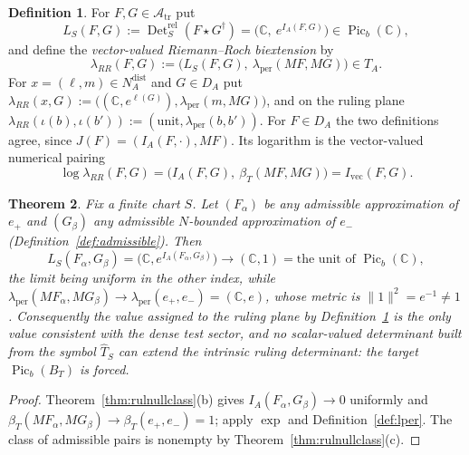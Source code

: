 \documentclass[11pt]{amsart}
\newtheorem{theorem}{Theorem}[section]
\theoremstyle{definition}
\newtheorem{definition}[theorem]{Definition}
\theoremstyle{remark}
\newcommand{\C}{\mathbb C}
\newcommand{\Det}{\operatorname{Det}}
\newcommand{\Picb}{\operatorname{Pic}_{b}}
\newcommand{\Th}{\widehat{T}}
\newcommand{\DA}{D_A}
\newcommand{\Atr}{\mathcal A_{\mathrm{tr}}}
\newcommand{\BT}{B_T}
\newcommand{\NAd}{N_A^{\mathrm{dist}}}
\begin{document}
\begin{definition}\label{def:RR}
For $F,G\in\Atr$ put
\begin{equation}\label{eq:LS}
L_S(F,G):=\Det^{\mathrm{rel}}_S(F\star G^{\dagger})=
\bigl(\C,\ e^{I_A(F,G)}\bigr)\in\Picb(\C),
\end{equation}
and define the \emph{vector-valued Riemann--Roch biextension} by
\begin{equation}\label{eq:lRR}
\lambda_{RR}(F,G):=\bigl(L_S(F,G),\ \lambda_{\mathrm{per}}(MF,MG)\bigr)\in T_A .
\end{equation}
For $x=(\ell,m)\in\NAd$ and $G\in\DA$ put
$\lambda_{RR}(x,G):=\bigl((\C,e^{\ell(G)}),\lambda_{\mathrm{per}}(m,MG)\bigr)$,
and on the ruling plane
$\lambda_{RR}(\iota(b),\iota(b')):=(\mathrm{unit},\lambda_{\mathrm{per}}(b,b'))$.  For
$F\in\DA$ the two definitions agree, since $J(F)=(I_A(F,\cdot),MF)$.  Its
logarithm is the vector-valued numerical pairing
\begin{equation}\label{eq:logRR}
\log\lambda_{RR}(F,G)=\bigl(I_A(F,G),\ \beta_T(MF,MG)\bigr)
=I_{\mathrm{vec}}(F,G).
\end{equation}
\end{definition}

\begin{theorem}\label{thm:scalartrivial}
Fix a finite chart $S$.  Let $(F_{\alpha})$ be any admissible approximation of
$e_+$ and $(G_{\beta})$ any admissible $N$-bounded approximation of $e_-$
(Definition~\ref{def:admissible}).  Then
\begin{equation}\label{eq:trivial}
L_S(F_{\alpha},G_{\beta})=\bigl(\C,e^{I_A(F_{\alpha},G_{\beta})}\bigr)
\longrightarrow(\C,1)=\text{the unit of }\Picb(\C),
\end{equation}
the limit being uniform in the other index, while
$\lambda_{\mathrm{per}}(MF_{\alpha},MG_{\beta})\to
\lambda_{\mathrm{per}}(e_+,e_-)=(\C,e)$, whose metric is
$\lVert1\rVert^{2}=e^{-1}\ne1$.  Consequently the value assigned to the ruling
plane by Definition~\ref{def:RR} is the only value consistent with the dense
test sector, and no scalar-valued determinant built from the symbol $\Th_S$ can
extend the intrinsic ruling determinant: the target $\Picb(\BT)$ is forced.
\end{theorem}

\begin{proof}
Theorem~\ref{thm:rulnullclass}(b) gives $I_A(F_{\alpha},G_{\beta})\to0$
uniformly and $\beta_T(MF_{\alpha},MG_{\beta})\to\beta_T(e_+,e_-)=1$; apply
$\exp$ and Definition~\ref{def:lper}.  The class of admissible pairs is
nonempty by Theorem~\ref{thm:rulnullclass}(c).
\end{proof}
\end{document}
